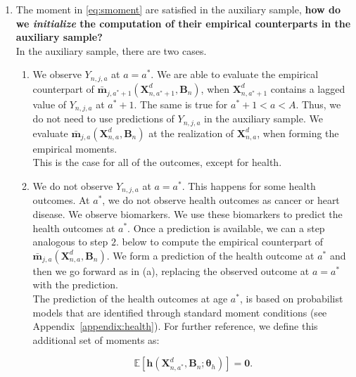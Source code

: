 \begin{enumerate}
\item The moment in \eqref{eq:smoment} are satisfied in the auxiliary sample, \textbf{how do we \textit{initialize} the computation of their empirical counterparts in the auxiliary sample?} \\ 
\noindent In the auxiliary sample, there are two cases.\\

\begin{enumerate}
\item We observe $Y_{n,j,a}$ at $a = a^*$. We are able to evaluate the empirical counterpart of $\bm{\bar{m}}_{j,a^*+1} \left( \bm{X}_{n,a^*+1}^d, \bm{B}_{n} \right) $, when $ \bm{X}_{n,a^*+1}^d$ contains a lagged value of $Y_{n,j,a}$ at $a^*+1$. The same is true for $a^*+1 < a < A$. Thus, we do not need to use predictions of $Y_{n,j,a}$ in the auxiliary sample. We evaluate $\bm{\bar{m}}_{j,a} \left( \bm{X}_{n,a}^d, \bm{B}_{n} \right)$ at  the realization of $\bm{X}_{n,a}^d$, when forming the empirical moments.\\

\noindent This is the case for all of the outcomes, except for health.\\

\item We do not observe $Y_{n,j,a}$ at $a = a^*$. This happens for some health outcomes. At $a^*$, we do not observe health outcomes as cancer or heart disease. We observe biomarkers.  We use these biomarkers to predict the health outcomes at $a^*$. Once a prediction is available, we can a step analogous to step $2.$ below to compute the empirical counterpart of $\bm{\bar{m}}_{j,a} \left( \bm{X}_{n,a}^d, \bm{B}_{n} \right)$. We form a prediction of the health outcome at $a^*$ and then we go forward as in (a), replacing the observed outcome at $a = a^*$ with the prediction.\\

\noindent The prediction of the health outcomes at age $a^*$, is based on probabilist models that are identified through standard moment conditions (see Appendix~\ref{appendix:health}). For further reference, we define this additional set of moments as: 

\begin{equation}
\mathbb{E} \left[ \mathbf{h} \left(  \bm{X}_{n,a^*}^d, \bm{B}_{n}; \bm{\theta}_{h}  \right) \right] = \mathbf{0}.
\end{equation}
\end{enumerate}


\end{enumerate}
